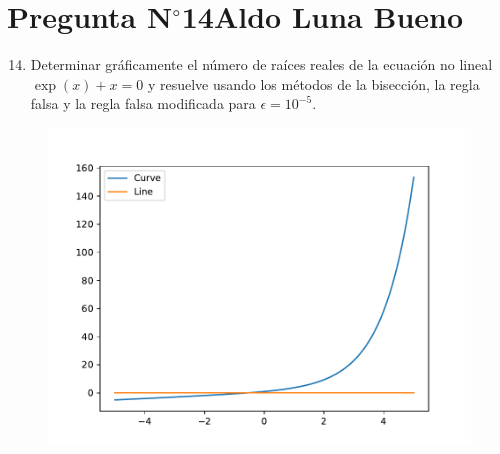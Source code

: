 \section{Pregunta N$^{\circ}$14\qquad Aldo Luna Bueno}

\begin{frame}
	\begin{enumerate}\setcounter{enumi}{13}
		\item

		      Determinar gráficamente el número de raíces reales de la
		      ecuación no lineal
		      \begin{math}
			      \exp\left(x\right)+x=
			      0
		      \end{math}
		      y resuelve usando los métodos de la bisección, la regla
		      falsa y la regla falsa modificada para $\epsilon=10^{-5}$.

	\end{enumerate}

	\begin{solution}

		\begin{figure}
			\includegraphics[width=0.5\paperwidth]{p14.pdf}
		\end{figure}
	\end{solution}
\end{frame}

